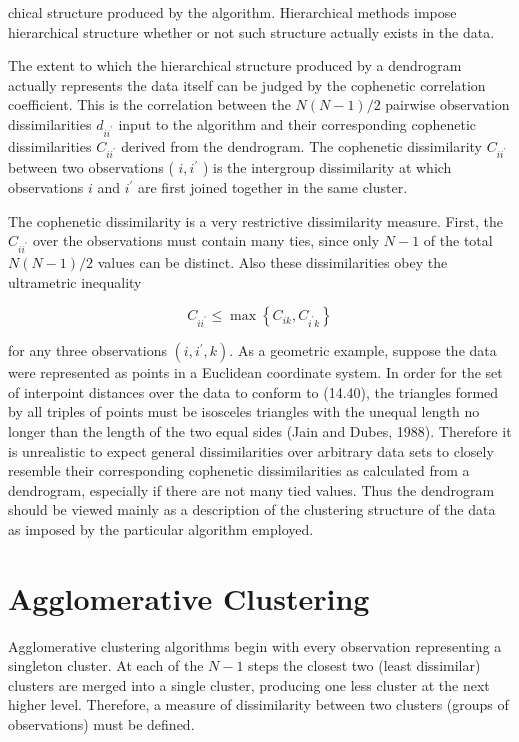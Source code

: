 \documentclass[10pt]{article}
\begin{document}
chical structure produced by the algorithm. Hierarchical methods impose hierarchical structure whether or not such structure actually exists in the data.

The extent to which the hierarchical structure produced by a dendrogram actually represents the data itself can be judged by the cophenetic correlation coefficient. This is the correlation between the $N(N-1) / 2$ pairwise observation dissimilarities $d_{i i^{\prime}}$ input to the algorithm and their corresponding cophenetic dissimilarities $C_{i i^{\prime}}$ derived from the dendrogram. The cophenetic dissimilarity $C_{i i^{\prime}}$ between two observations ( $i, i^{\prime}$ ) is the intergroup dissimilarity at which observations $i$ and $i^{\prime}$ are first joined together in the same cluster.

The cophenetic dissimilarity is a very restrictive dissimilarity measure. First, the $C_{i i^{\prime}}$ over the observations must contain many ties, since only $N-1$ of the total $N(N-1) / 2$ values can be distinct. Also these dissimilarities obey the ultrametric inequality


\begin{equation*}
C_{i i^{\prime}} \leq \max \left\{C_{i k}, C_{i^{\prime} k}\right\} \tag{14.40}
\end{equation*}


for any three observations $\left(i, i^{\prime}, k\right)$. As a geometric example, suppose the data were represented as points in a Euclidean coordinate system. In order for the set of interpoint distances over the data to conform to (14.40), the triangles formed by all triples of points must be isosceles triangles with the unequal length no longer than the length of the two equal sides (Jain and Dubes, 1988). Therefore it is unrealistic to expect general dissimilarities over arbitrary data sets to closely resemble their corresponding cophenetic dissimilarities as calculated from a dendrogram, especially if there are not many tied values. Thus the dendrogram should be viewed mainly as a description of the clustering structure of the data as imposed by the particular algorithm employed.

\section*{Agglomerative Clustering}
Agglomerative clustering algorithms begin with every observation representing a singleton cluster. At each of the $N-1$ steps the closest two (least dissimilar) clusters are merged into a single cluster, producing one less cluster at the next higher level. Therefore, a measure of dissimilarity between two clusters (groups of observations) must be defined.
\end{document}
